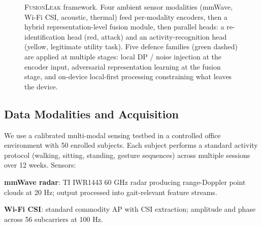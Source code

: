 \documentclass[sigconf,nonacm]{acmart}
\begin{document}
\begin{figure}[t]
\caption{\textsc{FusionLeak} framework. Four ambient sensor
  modalities (mmWave, Wi-Fi CSI, acoustic, thermal) feed
  per-modality encoders, then a hybrid representation-level fusion
  module, then parallel heads: a re-identification head (red,
  attack) and an activity-recognition head (yellow, legitimate
  utility task). Five defence families (green dashed) are applied
  at multiple stages: local DP / noise injection at the encoder
  input, adversarial representation learning at the fusion stage,
  and on-device local-first processing constraining what leaves the
  device.}
\label{fig:framework}
\end{figure}

\subsection{Data Modalities and Acquisition}

We use a calibrated multi-modal sensing testbed in a controlled
office environment with 50 enrolled subjects. Each subject performs
a standard activity protocol (walking, sitting, standing, gesture
sequences) across multiple sessions over 12 weeks. Sensors:

\textbf{mmWave radar}: TI IWR1443 60 GHz radar producing
range-Doppler point clouds at 20 Hz; output processed into
gait-relevant feature streams.

\textbf{Wi-Fi CSI}: standard commodity AP with CSI extraction;
amplitude and phase across 56 subcarriers at 100 Hz.
\end{document}
